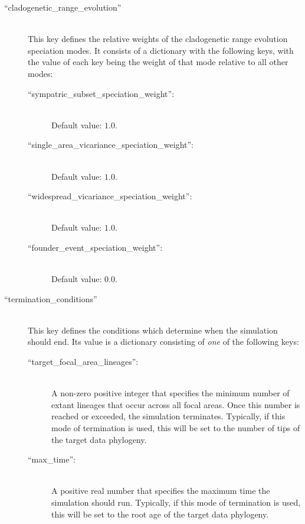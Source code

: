 \documentclass[11pt,openany]{memoir} %
\begin{document}
\begin{description}
    \item[``cladogenetic\_range\_evolution'']  \hfill \\
        This key defines the relative weights of the cladogenetic range evolution speciation modes.
        It consists of a dictionary with the following keys, with the value of each key being the weight of that mode relative to all other modes:
        \begin{description}
            \item[``sympatric\_subset\_speciation\_weight'':] \hfill \\
                Default value: $1.0$.
            \item[``single\_area\_vicariance\_speciation\_weight'':] \hfill \\
                Default value: $1.0$.
            \item[``widespread\_vicariance\_speciation\_weight'':] \hfill \\
                Default value: $1.0$.
            \item[``founder\_event\_speciation\_weight'':] \hfill \\
                Default value: $0.0$.
        \end{description}

    \item[``termination\_conditions'']  \hfill \\
        This key defines the conditions which determine when the simulation should end.
        Its value is a dictionary consisting of \textit{one} of the following keys:
        \begin{description}
            \item[``target\_focal\_area\_lineages'':] \hfill \\
                A non-zero positive integer that specifies the minimum number of extant lineages that occur across all focal areas.
                Once this number is reached or exceeded, the simulation terminates.
                Typically, if this mode of termination is used, this will be set to the number of tips of the target data phylogeny.
            \item[``max\_time'':] \hfill \\
                A positive real number that specifies the maximum time the simulation should run.
                Typically, if this mode of termination is used, this will be set to the root age of the target data phylogeny.
        \end{description}

\end{description}
\end{document}
